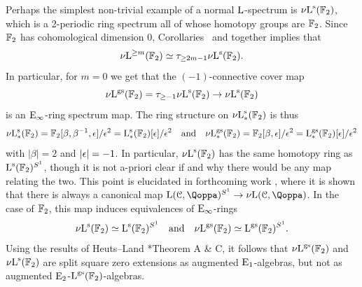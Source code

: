 \begin{example}
\label{example:F2}%
Perhaps the simplest non-trivial example of a normal $\operatorname L$-spectrum is ${\nu\!\operatorname L}^{\mathrm{s}}(\mathbb{F}_2)$, which is a 2-periodic ring spectrum all of whose homotopy groups are $\mathbb{F}_2$. 
Since $\mathbb{F}_2$ has cohomological dimension $0$, Corollaries~ and  together implies that
\[
{\nu\!\operatorname L}^{\geq m}(\mathbb{F}_2) \simeq \tau_{\geq 2m-1}{\nu\!\operatorname L}^{\mathrm{s}}(\mathbb{F}_2) .
\]
In particular, for $m=0$ we get that the $(-1)$-connective cover map
\[
{\nu\!\operatorname L}^{\mathrm{gs}}(\mathbb{F}_2) = \tau_{\geq -1}{\nu\!\operatorname L}^{\mathrm{s}}(\mathbb{F}_2) \to {\nu\!\operatorname L}^{\mathrm{s}}(\mathbb{F}_2)
\]
is an ${\mathrm{E}_{\infty}}$-ring spectrum map. %
The ring structure on ${\nu\!\operatorname L}^{\mathrm{s}}_*(\mathbb{F}_2)$ is thus
\[
{\nu\!\operatorname L}^{\mathrm{s}}_*(\mathbb{F}_2) = \mathbb{F}_2[\beta,\beta^{-1},\epsilon]/\epsilon^2 = \operatorname L^{\mathrm{s}}_*(\mathbb{F}_2)[\epsilon]/\epsilon^2 \quad\text{and}\quad {\nu\!\operatorname L}^{\mathrm{gs}}_*(\mathbb{F}_2) = \mathbb{F}_2[\beta,\epsilon]/\epsilon^2 = \operatorname L^{\mathrm{gs}}_*(\mathbb{F}_2)[\epsilon]/\epsilon^2
\]
with $|\beta| = 2$ and $|\epsilon| =-1$.
In particular, ${\nu\!\operatorname L}^{\mathrm{s}}(\mathbb{F}_2)$ has the same homotopy ring as $\operatorname L^{\mathrm{s}}(\mathbb{F}_2)^{S^1}$, though it is not a-priori clear if and why there would be any map relating the two.
This point is elucidated in forthcoming work \cite{Harpaz-Nikolaus-Shah}, where it is shown that there is always a canonical map $\L(\C,\QF)^{S^1} \to \NL(\C,\QF)$. In the case of $\mathbb{F}_2$, this map induces equivalences of ${\mathrm{E}_{\infty}}$-rings
\[
{\nu\!\operatorname L}^{\mathrm{s}}(\mathbb{F}_2) \simeq \operatorname L^{\mathrm{s}}(\mathbb{F}_2)^{S^1} \quad\text{and}\quad {\nu\!\operatorname L}^{\mathrm{gs}}(\mathbb{F}_2) \simeq \operatorname L^{\mathrm{gs}}(\mathbb{F}_2)^{S^1} .
\]
Using the results of Heuts--Land \cite{formality}*{Theorem A \& C}, it follows that ${\nu\!\operatorname L}^{\mathrm{gs}}(\mathbb{F}_2)$ and ${\nu\!\operatorname L}^{\mathrm{s}}(\mathbb{F}_2)$ are split square zero extensions as augmented ${\mathrm{E}_{1}}$-algebras, but not
as augmented ${\mathrm{E}_{2}}$-$\operatorname L^{\mathrm{gs}}(\mathbb{F}_2)$-algebras. 
\end{example}




